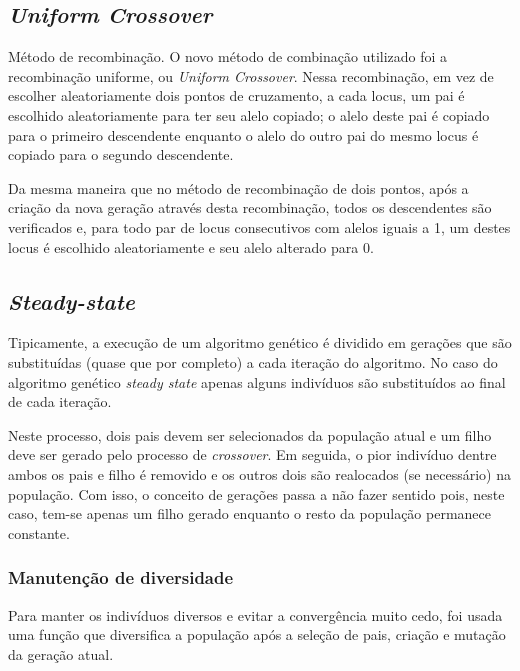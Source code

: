 \documentclass[12pt,a4paper]{article}
\begin{document}
    \subsection{\textit{Uniform Crossover}}

        Método de recombinação. O novo método de combinação utilizado foi a recombinação uniforme, ou \textit{Uniform Crossover}. Nessa recombinação, em vez de escolher aleatoriamente dois
        pontos de cruzamento, a cada locus, um pai é escolhido aleatoriamente para ter seu alelo copiado; o alelo deste pai é copiado para o primeiro descendente enquanto o alelo do outro
        pai do mesmo locus é copiado para o segundo descendente.

        Da mesma maneira que no método de recombinação de dois pontos, após a criação da nova geração através desta recombinação, todos os descendentes são verificados e, para todo par de locus
        consecutivos com alelos iguais a 1, um destes locus é escolhido aleatoriamente e seu alelo alterado para 0.


    \subsection{\emph{Steady-state}}

        Tipicamente, a execução de um algoritmo genético é dividido em gerações que são substituídas (quase que por completo) a cada iteração do algoritmo. No caso do algoritmo genético \emph{steady
        state} apenas alguns indivíduos são substituídos ao final de cada iteração.

        Neste processo, dois pais devem ser selecionados da população atual e um filho deve ser gerado pelo processo de \emph{crossover}. Em seguida, o pior indivíduo dentre ambos os pais e filho é
        removido e os outros dois são realocados (se necessário) na população. Com isso, o conceito de gerações passa a não fazer sentido pois, neste caso, tem-se apenas um filho gerado enquanto o
        resto da população permanece constante.  

    \subsubsection{Manutenção de diversidade}

        Para manter os indivíduos diversos e evitar a convergência muito cedo, foi usada uma função que diversifica a população após a seleção de pais, criação e mutação da geração atual.
\end{document}
